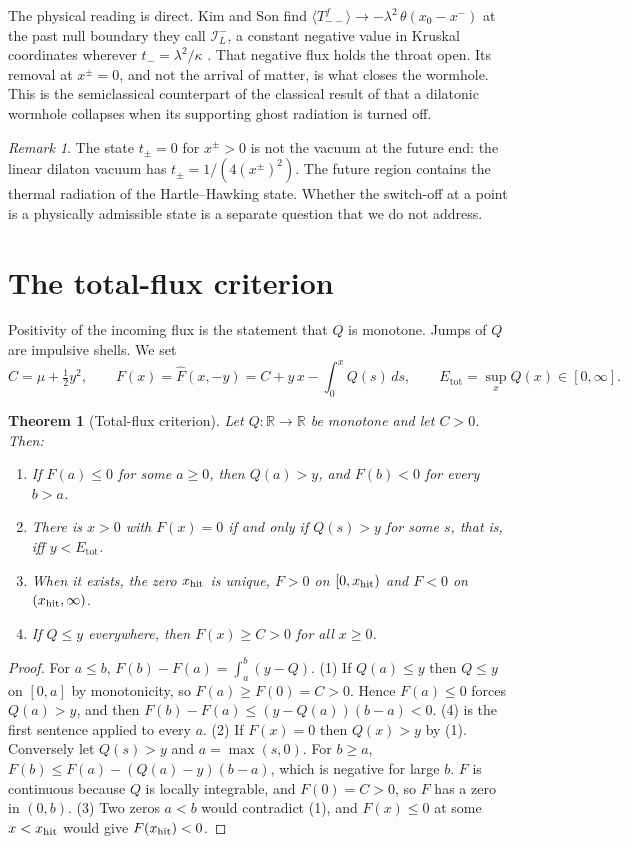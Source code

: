 \documentclass[11pt]{article}
\newtheorem{theorem}{Theorem}
\theoremstyle{remark}
\newtheorem{remark}{Remark}
\newcommand{\Etot}{E_{\mathrm{tot}}}
\newcommand{\Fh}{\widehat F}
\begin{document}
The physical reading is direct. Kim and Son find $\langle T^f_{--}\rangle\to-\lambda^2\,\theta(x_0-x^-)$ at the past null boundary they call $\mathcal I^-_L$, a constant negative value in Kruskal coordinates wherever $t_-=\lambda^2/\kappa$ \cite{KimSon}. That negative flux holds the throat open. Its removal at $x^\pm=0$, and not the arrival of matter, is what closes the wormhole. This is the semiclassical counterpart of the classical result of \cite{HKL} that a dilatonic wormhole collapses when its supporting ghost radiation is turned off.

\begin{remark}
The state $t_\pm=0$ for $x^\pm>0$ is not the vacuum at the future end: the linear dilaton vacuum has $t_\pm=1/(4(x^\pm)^2)$. The future region contains the thermal radiation of the Hartle--Hawking state. Whether the switch-off at a point is a physically admissible state is a separate question that we do not address.
\end{remark}

\section{The total-flux criterion}\label{sec:flux}

Positivity of the incoming flux is the statement that $Q$ is monotone. Jumps of $Q$ are impulsive shells. We set
\[
C=\mu+\tfrac12y^2,\qquad F(x)=\Fh(x,-y)=C+y\,x-\int_0^xQ(s)\,ds,\qquad \Etot=\sup_xQ(x)\in[0,\infty].
\]

\begin{theorem}[Total-flux criterion]\label{thm:flux}
Let $Q:\mathbb R\to\mathbb R$ be monotone and let $C>0$. Then:
\begin{enumerate}
\item If $F(a)\le0$ for some $a\ge0$, then $Q(a)>y$, and $F(b)<0$ for every $b>a$.
\item There is $x>0$ with $F(x)=0$ if and only if $Q(s)>y$ for some $s$, that is, iff $y<\Etot$.
\item When it exists, the zero $x_{\rm hit}$ is unique, $F>0$ on $[0,x_{\rm hit})$ and $F<0$ on $(x_{\rm hit},\infty)$.
\item If $Q\le y$ everywhere, then $F(x)\ge C>0$ for all $x\ge0$.
\end{enumerate}
\end{theorem}
\begin{proof}
For $a\le b$, $F(b)-F(a)=\int_a^b(y-Q)$. (1) If $Q(a)\le y$ then $Q\le y$ on $[0,a]$ by monotonicity, so $F(a)\ge F(0)=C>0$. Hence $F(a)\le0$ forces $Q(a)>y$, and then $F(b)-F(a)\le(y-Q(a))(b-a)<0$. (4) is the first sentence applied to every $a$. (2) If $F(x)=0$ then $Q(x)>y$ by (1). Conversely let $Q(s)>y$ and $a=\max(s,0)$. For $b\ge a$, $F(b)\le F(a)-(Q(a)-y)(b-a)$, which is negative for large $b$. $F$ is continuous because $Q$ is locally integrable, and $F(0)=C>0$, so $F$ has a zero in $(0,b)$. (3) Two zeros $a<b$ would contradict (1), and $F(x)\le0$ at some $x<x_{\rm hit}$ would give $F(x_{\rm hit})<0$.
\end{proof}
\end{document}
